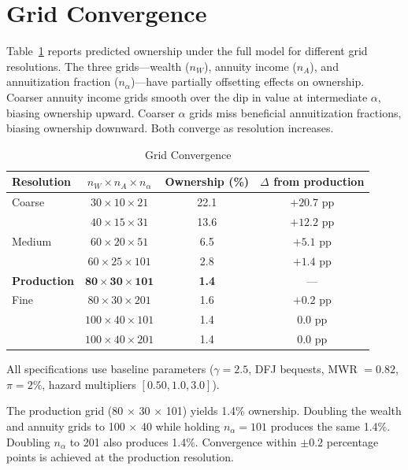 \documentclass[12pt]{article}
\begin{document}
\section{Grid Convergence}
\label{app:grid_convergence}

Table~\ref{tab:grid_convergence} reports predicted ownership under the full model for different grid resolutions. The three grids---wealth ($n_W$), annuity income ($n_A$), and annuitization fraction ($n_\alpha$)---have partially offsetting effects on ownership. Coarser annuity income grids smooth over the dip in value at intermediate $\alpha$, biasing ownership upward. Coarser $\alpha$ grids miss beneficial annuitization fractions, biasing ownership downward. Both converge as resolution increases.

\begin{table}[htbp]
\centering
\caption{Grid Convergence}
\label{tab:grid_convergence}
\begin{tabular}{lccc}
\toprule
Resolution & $n_W \times n_A \times n_\alpha$ & Ownership (\%) & $\Delta$ from production \\
\midrule
Coarse & $30 \times 10 \times 21$ & 22.1 & $+20.7$ pp \\
 & $40 \times 15 \times 31$ & 13.6 & $+12.2$ pp \\
Medium & $60 \times 20 \times 51$ & 6.5 & $+5.1$ pp \\
 & $60 \times 25 \times 101$ & 2.8 & $+1.4$ pp \\
\textbf{Production} & $\mathbf{80 \times 30 \times 101}$ & \textbf{1.4} & --- \\
Fine & $80 \times 30 \times 201$ & 1.6 & $+0.2$ pp \\
 & $100 \times 40 \times 101$ & 1.4 & $0.0$ pp \\
 & $100 \times 40 \times 201$ & 1.4 & $0.0$ pp \\
\bottomrule
\end{tabular}
\begin{tablenotes}
\small
\item All specifications use baseline parameters ($\gamma = 2.5$, DFJ bequests, MWR $= 0.82$, $\pi = 2\%$, hazard multipliers $[0.50, 1.0, 3.0]$).
\end{tablenotes}
\end{table}

The production grid (80 $\times$ 30 $\times$ 101) yields 1.4\% ownership. Doubling the wealth and annuity grids to 100 $\times$ 40 while holding $n_\alpha = 101$ produces the same 1.4\%. Doubling $n_\alpha$ to 201 also produces 1.4\%. Convergence within $\pm 0.2$ percentage points is achieved at the production resolution.
\end{document}
